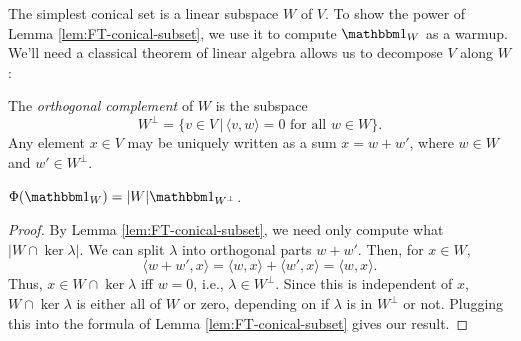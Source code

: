 The simplest conical set is a linear subspace $W$ of $V$.
To show the power of Lemma \ref{lem:FT-conical-subset}, we use it to compute $\IND_W$
as a warmup. We'll need a classical theorem of linear algebra allows us to decompose $V$
along $W$:
\begin{prop}
    The \emph{orthogonal complement} of $W$ is the subspace    
    \[ W^\perp = \{ v \in V \,|\, \langle v, w \rangle = 0 \text{ for all } w \in W \}. \]
    Any element $x\in V$ may be uniquely written as a sum $x = w + w'$, where $w\in W$
    and $w'\in W^\perp$.
\end{prop}

\begin{thm}\label{thm:FT-subspace}
    $\Phi(\IND_W) = |W| \IND_{W^\perp}$.
    \begin{proof}
        By Lemma \ref{lem:FT-conical-subset}, we need only compute what 
        $|W\cap\ker\lambda|$. We can split $\lambda$ into orthogonal parts $w + w'$.
        Then, for $x\in W$,
        \[ \langle w + w', x \rangle = \langle w, x \rangle + \langle w', x \rangle
            = \langle w, x \rangle. \]
        Thus, $x\in W\cap\ker\lambda$ iff $w = 0$, i.e., $\lambda\in W^\perp$. Since
        this is independent of $x$, $W\cap\ker\lambda$ is either all of $W$ or zero,
        depending on if $\lambda$ is in $W^\perp$ or not. Plugging this into the
        formula of Lemma \ref{lem:FT-conical-subset} gives our result.
    \end{proof}
\end{thm}